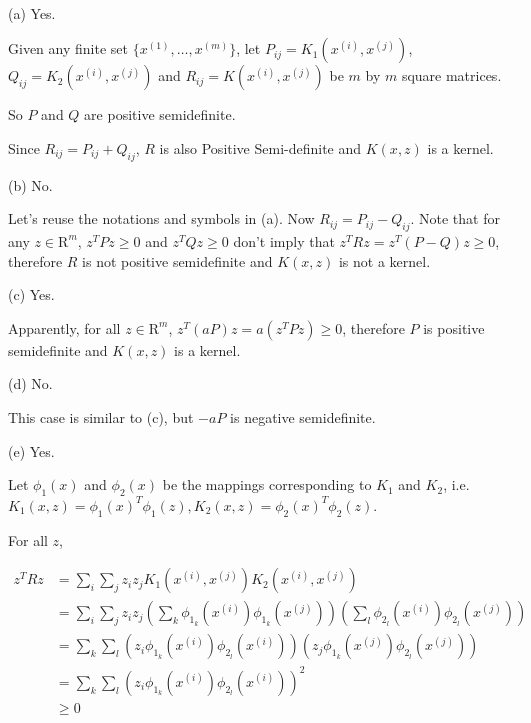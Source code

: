 \begin{answer}
	\\
	(a) Yes.
	
	Given any finite set $\{x^{(1)}, \ldots, x^{(m)}\}$, let $P_{ij} = K_1(x^{(i)}, x^{(j)})$, $Q_{ij} = K_2(x^{(i)}, x^{(j)})$ and $R_{ij} = K(x^{(i)}, x^{(j)})$ be $m$ by $m$ square matrices.
	
	So $P$ and $Q$ are positive semidefinite.
	
	Since $R_{ij} = P_{ij} + Q_{ij}$, $R$ is also Positive Semi-definite and $K(x, z)$ is a kernel.
	
	
	
	(b) No.
	
	Let's reuse the notations and symbols in (a). Now $R_{ij} = P_{ij} - Q_{ij}$. Note that for any $z\in \mathrm R^m$, $z^T P z\ge 0$ and $z^T Q z\ge 0$ don't imply that $z^T R z = z^T (P - Q) z \ge 0$, therefore $R$ is not positive semidefinite and $K(x, z)$ is not a kernel.
	
	
	
	(c) Yes.
	
	Apparently, for all $z\in \mathrm R^m$, $z^T (aP) z = a(z^T P z)\ge 0$, therefore $P$ is positive semidefinite and $K(x, z)$ is a kernel.
	
	
	
	(d) No.
	
	This case is similar to (c), but $-aP$ is negative semidefinite.
	
	
	
	(e) Yes.
	
	Let $\phi_1(x)$ and $\phi_2(x)$ be the mappings corresponding to $K_1$ and $K_2$, i.e. $K_1(x, z) = \phi_1(x)^T\phi_1(z), K_2(x, z) = \phi_2(x)^T\phi_2(z)$.
	
	For all $z$,
	
	$$
	\begin{aligned}
		z^T R z & = \sum_i \sum_j z_i z_j K_1(x^{(i)}, x^{(j)}) K_2(x^{(i)}, x^{(j)})\\
		& = \sum_i \sum_j z_i z_j \left(\sum_k \phi_{1_k}(x^{(i)}) \phi_{1_k}(x^{(j)})\right) \left(\sum_l \phi_{2_l}(x^{(i)}) \phi_{2_l}(x^{(j)})\right)\\
		& = \sum_k \sum_l \left(z_i \phi_{1_k}(x^{(i)}) \phi_{2_l}(x^{(i)}) \right) \left(z_j \phi_{1_k}(x^{(j)}) \phi_{2_l}(x^{(j)}) \right)\\
		& = \sum_k \sum_l \left(z_i \phi_{1_k}(x^{(i)}) \phi_{2_l}(x^{(i)}) \right)^2\\
		& \ge 0
	\end{aligned}
	$$
	

\end{answer}
